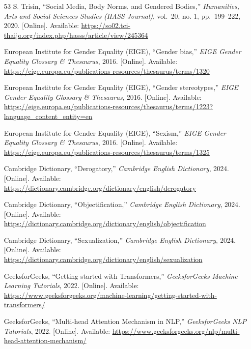 \documentclass[12pt,oneside,openright,a4paper]{cpe-english-project}
\begin{document}
\begin{thebibliography}{53}
\hypertarget{bib:ref8}{} S. Trisin, ``Social Media, Body Norms, and Gendered Bodies,''
\emph{Humanities, Arts and Social Sciences Studies (HASS Journal)},
vol.~20, no. 1, pp.~199--222, 2020. {[}Online{]}. Available:
\url{https://so02.tci-thaijo.org/index.php/hasss/article/view/245364}

\hypertarget{bib:ref9}{} European Institute for Gender Equality (EIGE), ``Gender bias,''
\emph{EIGE Gender Equality Glossary \& Thesaurus}, 2016. {[}Online{]}.
Available:
\url{https://eige.europa.eu/publications-resources/thesaurus/terms/1320}

\hypertarget{bib:ref10}{} European Institute for Gender Equality (EIGE), ``Gender
stereotypes,'' \emph{EIGE Gender Equality Glossary \& Thesaurus}, 2016.
{[}Online{]}. Available:
\url{https://eige.europa.eu/publications-resources/thesaurus/terms/1223?language_content_entity=en}

\hypertarget{bib:ref11}{} European Institute for Gender Equality (EIGE), ``Sexism,''
\emph{EIGE Gender Equality Glossary \& Thesaurus}, 2016. {[}Online{]}.
Available:
\url{https://eige.europa.eu/publications-resources/thesaurus/terms/1325}

\hypertarget{bib:ref12}{} Cambridge Dictionary, ``Derogatory,'' \emph{Cambridge English
Dictionary}, 2024. {[}Online{]}. Available:
\url{https://dictionary.cambridge.org/dictionary/english/derogatory}

\hypertarget{bib:ref13}{} Cambridge Dictionary, ``Objectification,'' \emph{Cambridge
English Dictionary}, 2024. {[}Online{]}. Available:
\url{https://dictionary.cambridge.org/dictionary/english/objectification}

\hypertarget{bib:ref14}{} Cambridge Dictionary, ``Sexualization,'' \emph{Cambridge
English Dictionary}, 2024. {[}Online{]}. Available:
\url{https://dictionary.cambridge.org/dictionary/english/sexualization}

\hypertarget{bib:ref15}{} GeeksforGeeks, ``Getting started with Transformers,''
\emph{GeeksforGeeks Machine Learning Tutorials}, 2022. {[}Online{]}.
Available:
\url{https://www.geeksforgeeks.org/machine-learning/getting-started-with-transformers/}

\hypertarget{bib:ref16}{} GeeksforGeeks, ``Multi-head Attention Mechanism in NLP,''
\emph{GeeksforGeeks NLP Tutorials}, 2022. {[}Online{]}. Available:
\url{https://www.geeksforgeeks.org/nlp/multi-head-attention-mechanism/}


\end{thebibliography}
\end{document}
